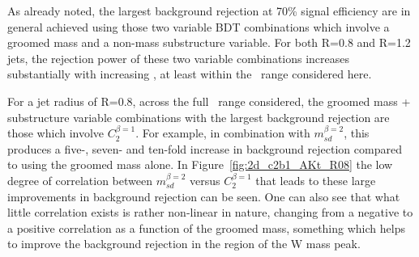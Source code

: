 As already noted, the largest background rejection at 70\% signal
efficiency are in general achieved using those two variable BDT combinations
which involve a groomed mass and a non-mass substructure variable. For
both R=0.8 and R=1.2 jets, the rejection power of these two variable
combinations increases substantially with increasing \pt, at least
within the \pt~range considered here.

For a jet radius of R=0.8, across the full \pt~range considered, the
groomed mass + substructure variable combinations with the
largest background rejection are those which
involve $C_2^{\beta=1}$. For example, in combination with
$m_{sd}^{\beta=2}$, this produces a five-, seven- and ten-fold
increase in background rejection compared to using the groomed mass
alone. In Figure~\ref{fig:2d_c2b1_AKt_R08} the low degree of
correlation between $m_{sd}^{\beta=2}$ versus $C_2^{\beta=1}$ that
leads to these large improvements in background rejection can be
seen. One can also see that what little correlation exists is rather
non-linear in nature, changing from a negative to a positive
correlation as a function of the groomed mass, something which helps
to improve the background rejection in the region of the W mass peak.

